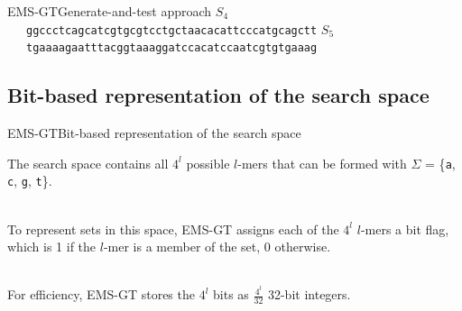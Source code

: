 \documentclass[pdf,xcolor={dvipsnames}]{beamer}
\begin{document}
\begin{frame}{EMS-GT}{Generate-and-test approach}
{			$S_4$\ \ \  \texttt{ggccctca{{g}catcgt{g}}cgtcctgctaacacattcccatgcagctt}\newline\newline\newline
			$S_5$\ \ \  \texttt{tgaaaagaatttacggtaaaggatccacatc{c{a}atcgt{g}}tgaaag}\newline\newline\newline
		 }
		\end{frame}

	\subsection{Bit-based representation of the search space}
	\begin{frame}{EMS-GT}{Bit-based representation of the search space}
		\begin{itemize}
		{
			\item The search space contains all $4^l$ possible $l$-mers that can be formed with
			$\Sigma$ = \{\texttt{a}, \texttt{c}, \texttt{g}, \texttt{t}\}. \\\ \\
			\item To represent sets in this space, EMS-GT assigns each of the $4^l$ $l$-mers a bit flag,
			which is 1 if the $l$-mer is a member of the set, 0 otherwise.\\\ \\
			\item For efficiency, EMS-GT stores the $4^l$ bits as $\frac{4^l}{32}$ 32-bit integers.
		}
		\end{itemize}
		\end{frame}
\end{document}
